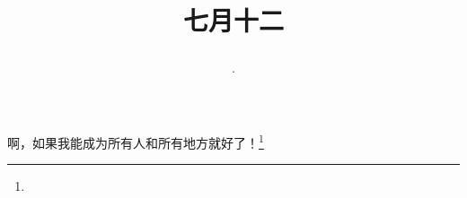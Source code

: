 \title{\date[d=15,m=8,y=2024][year:cn-y,年,month:cn,day:cn,日,·,weekday]·七月十二 }
啊，如果我能成为所有人和所有地方就好了！\footnote{ }

